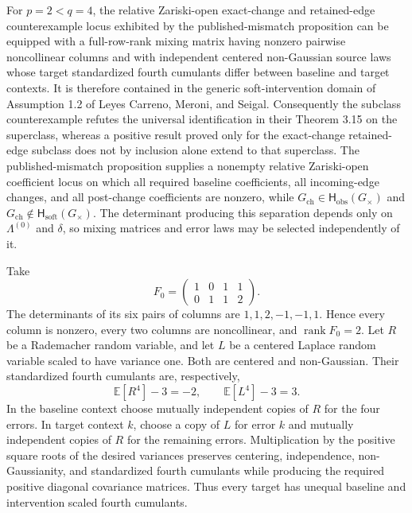 For \(p=2<q=4\), the relative Zariski-open exact-change and retained-edge counterexample locus exhibited by the published-mismatch proposition can be equipped with a full-row-rank mixing matrix having nonzero pairwise noncollinear columns and with independent centered non-Gaussian source laws whose target standardized fourth cumulants differ between baseline and target contexts.  It is therefore contained in the generic soft-intervention domain of Assumption 1.2 of Leyes Carreno, Meroni, and Seigal.  Consequently the subclass counterexample refutes the universal identification in their Theorem 3.15 on the superclass, whereas a positive result proved only for the exact-change retained-edge subclass does not by inclusion alone extend to that superclass.
The published-mismatch proposition supplies a nonempty relative Zariski-open coefficient locus on which all required baseline coefficients, all incoming-edge changes, and all post-change coefficients are nonzero, while \(G_{\mathrm{ch}}\in\mathsf H_{\mathrm{obs}}(G_\times)\) and \(G_{\mathrm{ch}}\notin\mathsf H_{\mathrm{soft}}(G_\times)\).  The determinant producing this separation depends only on \(\Lambda^{(0)}\) and \(\delta\), so mixing matrices and error laws may be selected independently of it.

Take
\[
 F_0=\begin{pmatrix}1&0&1&1\\0&1&1&2\end{pmatrix}.
\]
The determinants of its six pairs of columns are \(1,1,2,-1,-1,1\).  Hence every column is nonzero, every two columns are noncollinear, and \(\operatorname{rank}F_0=2\).  Let \(R\) be a Rademacher random variable, and let \(L\) be a centered Laplace random variable scaled to have variance one.  Both are centered and non-Gaussian.  Their standardized fourth cumulants are, respectively,
\[
 \mathbb E[R^4]-3=-2,
 \qquad
 \mathbb E[L^4]-3=3.
\]
In the baseline context choose mutually independent copies of \(R\) for the four errors.  In target context \(k\), choose a copy of \(L\) for error \(k\) and mutually independent copies of \(R\) for the remaining errors.  Multiplication by the positive square roots of the desired variances preserves centering, independence, non-Gaussianity, and standardized fourth cumulants while producing the required positive diagonal covariance matrices.  Thus every target has unequal baseline and intervention scaled fourth cumulants.

